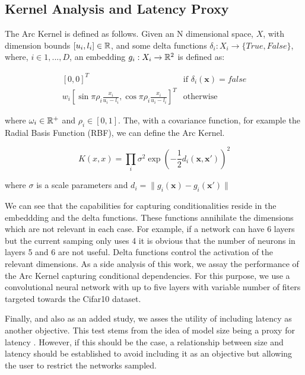 \documentclass[10pt, a4paper, twocolumn]{article}
\begin{document}
\subsection{Kernel Analysis and Latency Proxy}\label{analysis}

The Arc Kernel \cite{Swersky2014} is defined as follows. Given an N dimensional space, $X$, with dimension bounds $[u_{i}, l_{i}] \in \Bbb{R}$, and some delta functions $ \delta_{i}: X_{i} \rightarrow \{True, False\}$, where, $i \in {1,...,D}$, an embedding $g_{i}: X_{i}\rightarrow \Bbb{R}^{2}$ is defined as:

\[
\begin{array}{ll}
[0, 0]^{T}& \mbox{if $\delta_{i}(\mathbf{x}) = false$} \\
 w_{i}[\sin{\pi\rho_{i}\frac{x_{i}}{u_{i}-l_{i}}},\cos{\pi\rho_{i}\frac{x_{i}}{u_{i}-l_{i}}}]^{T} & \mbox{otherwise}
 \end{array} 
\]

where $\omega_{i}\in\Bbb{R}^{+}$ and $\rho_{i}\in[0, 1]$. The, with a covariance function, for example the Radial Basis Function (RBF), we can define the Arc Kernel.


\begin{equation}
K(x, x) =  \prod_{i}\sigma^{2}\exp(-\frac{1}{2}d_{i}(\mathbf{x}, \mathbf{x'}))^{2}
\end{equation}

where $\sigma$ is a scale parameters and $d_{i}=\|g_{i}(\mathbf{x})-g_{i}(\mathbf{x'})\|$

We can see that the capabilities for capturing conditionalities reside in the embeddding and the delta functions. These functions annihilate the dimensions which are not relevant in each case. For example, if a network can have 6 layers but the current samping only uses 4 it is obvious that the number of neurons in layers 5 and 6 are not useful. Delta functions control the activation of the relevant dimensions. As a side analysis of this work, we assay the performance of the Arc Kernel capturing conditional dependencies. For this purpose, we use a convolutional neural network with up to five layers with variable number of fiters targeted towards the Cifar10 dataset.

Finally, and also as an added study, we asses the utility of including latency as another objective. This test stems from the idea of model size being a proxy for latency \cite{Loni2020}. However, if this should be the case, a relationship between size and latency should be established to avoid including it as an objective but allowing the user to restrict the networks sampled.
\end{document}
